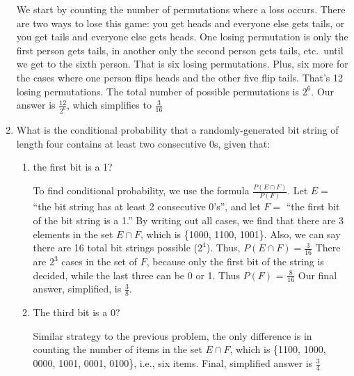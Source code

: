 \documentclass[12pt]{article}
\let\intersect\cap
\newenvironment{answer}{\larger[2]}{}
\begin{document}
\begin{enumerate}
\begin{answer}
We start by counting the number of permutations where a loss occurs. There are
two ways to lose this game: you get heads and everyone else gets tails, or you
get tails and everyone else gets heads. One losing permutation is only the first
person gets tails, in another only the second person gets tails, etc.\ until we
get to the sixth person. That is six losing permutations. Plus, six more for the
cases where one person flips heads and the other five flip tails. That's 12
losing permutations. The total number of possible permutations is $2^6$. Our
answer is $\frac{12}{2^6}$, which simplifies to $\frac{3}{16}$
\end{answer}

\vfill
\vfill

\newpage



\item What is the conditional probability that a randomly-generated bit string
of length four contains at least two consecutive 0s, given that:
%
\begin{enumerate}[itemsep=\fill,after=\vfill] %

\item the first bit is a 1?

\begin{answer}
To find conditional probability, we use the formula $\frac{P(E \intersect
F)}{P(F)}$. Let $E =$ ``the bit string has at least 2 consecutive 0's'', and let
$F =$ ``the first bit of the bit string is a 1.'' By writing out all cases, we
find that there are 3 elements in the set $E \intersect F$, which is \{1000,
1100, 1001\}. Also, we can say there are 16 total bit strings possible ($2^4$).
Thus, $P(E \intersect F) = \frac{3}{16}$ There are $2^3$ cases in the set of
$F$, because only the first bit of the string is decided, while the last three
can be 0 or 1. Thus $P(F)$ = $\frac{8}{16}$ Our final answer, simplified, is
$\frac{3}{8}$.
\end{answer}

\item The third bit is a 0?

\begin{answer}
Similar strategy to the previous problem, the only difference is in counting the
number of items in the set $E \intersect F$, which is \{1100, 1000, 0000, 1001,
0001, 0100\}, i.e., six items. Final, simplified answer is $\frac{3}{4}$
\end{answer}


\end{enumerate}
\end{enumerate}
\end{document}
